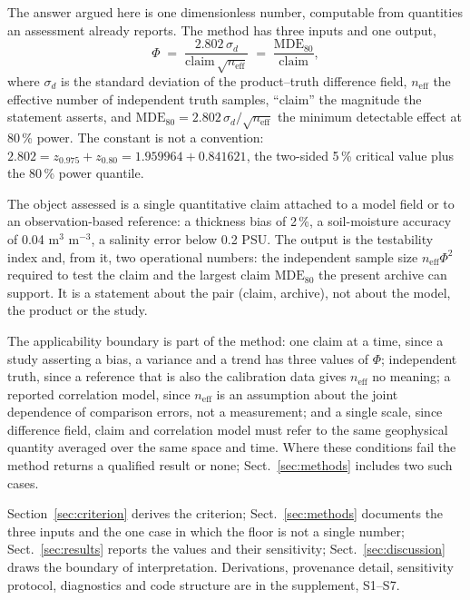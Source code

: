 \documentclass[preprint,12pt,authoryear]{elsarticle}
\begin{document}
The answer argued here is one dimensionless number, computable from quantities an assessment already reports. The method has three inputs and one output,
\begin{equation}
\Phi \;=\; \frac{2.802\,\sigma_d}{\mathrm{claim}\,\sqrt{n_{\mathrm{eff}}}}
\;=\;\frac{\mathrm{MDE}_{80}}{\mathrm{claim}},
\label{eq:phi}
\end{equation}
where $\sigma_d$ is the standard deviation of the product--truth difference field, $n_{\mathrm{eff}}$ the effective number of independent truth samples, ``claim'' the magnitude the statement asserts, and $\mathrm{MDE}_{80}=2.802\,\sigma_d/\sqrt{n_{\mathrm{eff}}}$ the minimum detectable effect at 80\,\% power. The constant is not a convention: $2.802 = z_{0.975}+z_{0.80} = 1.959964+0.841621$, the two-sided 5\,\% critical value plus the 80\,\% power quantile.

The object assessed is a single quantitative claim attached to a model field or to an observation-based reference: a thickness bias of 2\,\%, a soil-moisture accuracy of 0.04 m$^3$ m$^{-3}$, a salinity error below 0.2 PSU. The output is the testability index and, from it, two operational numbers: the independent sample size $n_{\mathrm{eff}}\Phi^{2}$ required to test the claim and the largest claim $\mathrm{MDE}_{80}$ the present archive can support. It is a statement about the pair (claim, archive), not about the model, the product or the study.

The applicability boundary is part of the method: one claim at a time, since a study asserting a bias, a variance and a trend has three values of $\Phi$; independent truth, since a reference that is also the calibration data gives $n_{\mathrm{eff}}$ no meaning; a reported correlation model, since $n_{\mathrm{eff}}$ is an assumption about the joint dependence of comparison errors, not a measurement; and a single scale, since difference field, claim and correlation model must refer to the same geophysical quantity averaged over the same space and time. Where these conditions fail the method returns a qualified result or none; Sect.~\ref{sec:methods} includes two such cases.

Section~\ref{sec:criterion} derives the criterion; Sect.~\ref{sec:methods} documents the three inputs and the one case in which the floor is not a single number; Sect.~\ref{sec:results} reports the values and their sensitivity; Sect.~\ref{sec:discussion} draws the boundary of interpretation. Derivations, provenance detail, sensitivity protocol, diagnostics and code structure are in the supplement, S1--S7.
\end{document}
